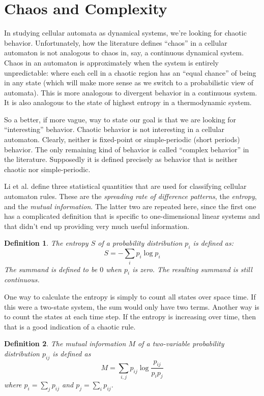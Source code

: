 \documentclass[12pt]{article}
\newtheorem*{Definition}{Definition}
\begin{document}
\section{Chaos and Complexity}

In studying cellular automata as dynamical systems, we're looking for
chaotic behavior.  Unfortunately, how the literature defines ``chaos''
in a cellular automaton is not analogous to chaos in, say, a continuous
dynamical system.  Chaos in an automaton is approximately when the
system is entirely unpredictable: where each cell in a chaotic region
has an ``equal chance'' of being in any state (which will make more
sense as we switch to a probabilistic view of automata).  This is more
analogous to divergent behavior in a continuous system.  It is also
analogous to the state of highest entropy in a thermodynamic system.

So a better, if more vague, way to state our goal is that we are looking
for ``interesting'' behavior.  Chaotic behavior is not interesting in a
cellular automaton.  Clearly, neither is fixed-point or simple-periodic
(short periods) behavior.  The only remaining kind of behavior is called
``complex behavior'' in the literature.  Supposedly it is defined
precisely as behavior that is neither chaotic nor simple-periodic.

Li et al. define three statistical quantities that are
used for classifying cellular automaton rules.  These are the
\textit{spreading rate of difference patterns}, the \textit{entropy},
and the \textit{mutual information}.  The latter two are repeated here,
since the first one has a complicated definition that is specific to
one-dimensional linear systems and that didn't end up providing very
much useful information.

\begin{Definition}
The entropy $S$ of a probability distribution $p_i$ is defined as:
\[ S = -\sum_i{p_i \log p_i} \]
The summand is defined to be $0$ when $p_i$ is zero.  The resulting
summand is still continuous.
\end{Definition}

One way to calculate the entropy is simply to count all states over
space time.  If this were a two-state system, the sum would only have
two terms.  Another way is to count the states at each time step.  If
the entropy is increasing over time, then that is a good indication of a
chaotic rule.

\begin{Definition}
The mutual information $M$ of a two-variable probability distribution
$p_{ij}$ is defined as
\[ M = \sum_{i,j}{p_{ij} \log \frac{p_{ij}}{p_i p_j}} \]
where $p_i = \sum_j{p_{ij}}$ and $p_j = \sum_i{p_{ij}}$.
\end{Definition}
\end{document}
